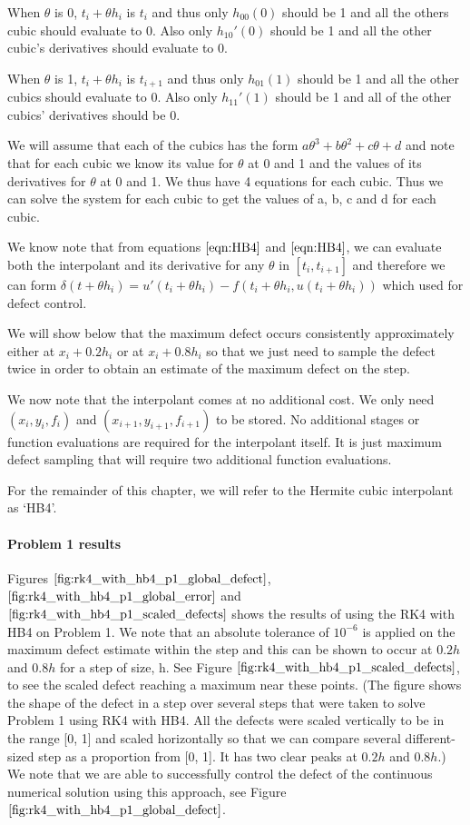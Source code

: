 \documentclass{article}
\begin{document}
When $\theta$ is 0, $t_i + \theta h_i$ is $t_i$ and thus only $h_{00}(0)$ should be 1 and all the others cubic should evaluate to 0. Also only $h_{10}'(0)$ should be 1 and all the other cubic's derivatives should evaluate to 0.

When $\theta$ is 1, $t_i + \theta h_i$ is $t_{i + 1}$ and thus only $h_{01}(1)$ should be 1 and all the other cubics should evaluate to 0. Also only $h_{11}'(1)$ should be 1 and all of the other cubics' derivatives should be 0.

We will assume that each of the cubics has the form $a\theta^3 + b\theta^2 + c\theta + d$ and note that for each cubic we know its value for $\theta$ at 0 and 1 and the values of its derivatives for $\theta$ at 0 and 1. We thus have 4 equations for each cubic. Thus we can solve the system for each cubic to get the values of a, b, c and d for each cubic.

We know note that from equations $\ref{eqn:HB4}$ and $\ref{eqn:HB4}$, we can evaluate both the interpolant and its derivative for any $\theta$ in $[t_i, t_{i + 1}]$ and therefore we can form $\delta(t + \theta h_i) = u'(t_i + \theta h_i) - f(t_i + \theta h_i, u(t_i + \theta h_i))$ which used for defect control.

We will show below that the maximum defect occurs consistently approximately either at $x_i + 0.2h_i$ or at $x_i + 0.8h_i$ so that we just need to sample the defect twice in order to obtain an estimate of the maximum defect on the step.

We now note that the interpolant comes at no additional cost. We only need $(x_i, y_i, f_i)$ and $(x_{i + 1}, y_{i + 1}, f_{i + 1})$ to be stored. No additional stages or function evaluations are required for the interpolant itself. It is just maximum defect sampling that will require two additional function evaluations.

For the remainder of this chapter, we will refer to the Hermite cubic interpolant as `HB4'.

\paragraph{Problem 1 results}
Figures $\ref{fig:rk4_with_hb4_p1_global_defect}$, $\ref{fig:rk4_with_hb4_p1_global_error}$ and $\ref{fig:rk4_with_hb4_p1_scaled_defects}$ shows the results of using the RK4 with HB4 on Problem 1. We note that an absolute tolerance of $10^{-6}$ is applied on the maximum defect estimate within the step and this can be shown to occur at $0.2h$ and $0.8h$ for a step of size, h. See Figure $\ref{fig:rk4_with_hb4_p1_scaled_defects}$, to see the scaled defect reaching a maximum near these points. (The figure shows the shape of the defect in a step over several steps that were taken to solve Problem 1 using RK4 with HB4. All the defects were scaled vertically to be in the range [0, 1] and scaled horizontally so that we can compare several different-sized step as a proportion from [0, 1]. It has two clear peaks at $0.2h$ and $0.8h$.) We note that we are able to successfully control the defect of the continuous numerical solution using this approach, see Figure $\ref{fig:rk4_with_hb4_p1_global_defect}$.
\end{document}
